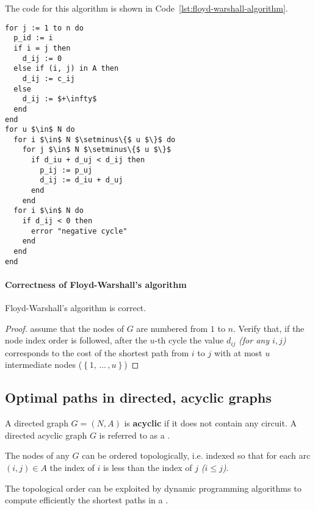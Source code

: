 \documentclass[english]{article}
\begin{document}
\bigskip
The code for this algorithm is shown in Code~\ref{lst:floyd-warshall-algorithm}.

\begin{lstlisting}[caption={Floyd-Warshall's algorithm}, label={lst:floyd-warshall-algorithm}, float]
for j := 1 to n do
  p_id := i
  if i = j then
    d_ij := 0
  else if (i, j) in A then
    d_ij := c_ij
  else
    d_ij := $+\infty$
  end
end
for u $\in$ N do
  for i $\in$ N $\setminus\{$ u $\}$ do
    for j $\in$ N $\setminus\{$ u $\}$
      if d_iu + d_uj < d_ij then
        p_ij := p_uj
        d_ij := d_iu + d_uj
      end
    end
  for i $\in$ N do
    if d_ij < 0 then
      error "negative cycle"
    end
  end
end
\end{lstlisting}

\paragraph{Correctness of Floyd-Warshall's algorithm}

\begin{proposition}
  Floyd-Warshall's algorithm is correct.
\end{proposition}

\begin{proof}
  assume that the nodes of \(G\) are numbered from \(1\) to \(n\).
  Verify that, if the node index order is followed, after the \(u\)-th cycle the value \(d_{ij}\) \textit{(for any \(i, j\))} corresponds to the cost of the shortest path from \(i\) to \(j\) with at most \(u\) intermediate nodes (\(\left\{ 1, \, \ldots \,, u \right\}\))
\end{proof}

\subsection{Optimal paths in directed, acyclic graphs}

A directed graph \(G = (N, A)\) is \textbf{acyclic} if it does not contain any circuit.
A directed acyclic graph \(G\) is referred to as a \DAG.

\begin{property}
  The nodes of any \DAG \(G\) can be ordered topologically, i.e. indexed so that for each arc \((i, j) \in A\) the index of \(i\) is less than the index of \(j\) \textit{(\(i \leq j\))}.
\end{property}

The topological order can be exploited by dynamic programming algorithms to compute efficiently the shortest paths in a \DAG.
\end{document}
